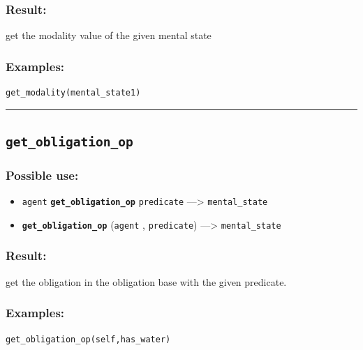 \documentclass[]{book}
\providecommand{\tightlist}{%
  \setlength{\itemsep}{0pt}\setlength{\parskip}{0pt}}
\theoremstyle{definition}
\theoremstyle{definition}
\theoremstyle{definition}
\theoremstyle{remark}
\begin{document}
\subsubsection{Result:}\label{result-214}

get the modality value of the given mental state

\subsubsection{Examples:}\label{examples-167}

\begin{verbatim}
get_modality(mental_state1) 
\end{verbatim}

\begin{center}\rule{0.5\linewidth}{\linethickness}\end{center}

\subsection{\texorpdfstring{\texttt{get\_obligation\_op}}{get\_obligation\_op}}\label{get_obligation_op}

\subsubsection{Possible use:}\label{possible-use-221}

\begin{itemize}
\tightlist
\item
  \texttt{agent} \textbf{\texttt{get\_obligation\_op}}
  \texttt{predicate} ---\textgreater{} \texttt{mental\_state}
\item
  \textbf{\texttt{get\_obligation\_op}} (\texttt{agent} ,
  \texttt{predicate}) ---\textgreater{} \texttt{mental\_state}
\end{itemize}

\subsubsection{Result:}\label{result-215}

get the obligation in the obligation base with the given predicate.

\subsubsection{Examples:}\label{examples-168}

\begin{verbatim}
get_obligation_op(self,has_water) 
\end{verbatim}
\end{document}

